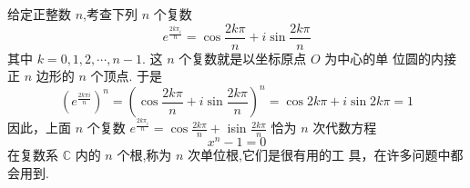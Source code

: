 \documentclass[13pt,fontset=mac]{ctexbeamer}
\begin{document}
\begin{frame}
	给定正整数 $n$,考查下列 $n$ 个复数
	\[
	{e}^{\frac{2 k \pi_{{i}}}{n}}=\cos \frac{2 k \pi}{n}+i\operatorname{sin} \frac{2 k \pi}{n}
	\]
	其中 $k=0,1,2, \cdots, n-1.$ 这 $n$ 个复数就是以坐标原点 $O$ 为中心的单 位圆的内接正 $n$ 边形的 $n$ 个顶点.
	于是
	\[
	\left({e}^{\frac{2 {k\pi i}}{n}}\right)^{n}=\left(\cos \frac{2 k \pi}{n}+i \operatorname{sin} \frac{2 k \pi}{n}\right)^{n}=\cos 2 k \pi+{i} \sin 2 k \pi=1
	\]
	因此，上面 $n$ 个复数 ${e}^{\frac{2 k \pi_{{i}}}{n}}=\cos \frac{2 k \pi}{n}+$ isin $\frac{2 k \pi}{n}$ 恰为 $n$ 次代数方程 $$x^{n}-1=0$$ 在复数系 $\mathbb{C}$ 内的 $n$ 个根,称为 $n$ 次单位根,它们是很有用的工
	具，在许多问题中都会用到.
\end{frame}
\end{document}

